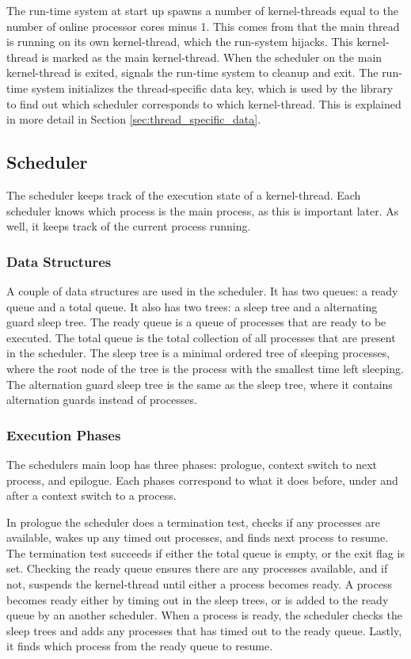 The run\hyp{}time system at start up spawns a number of kernel\hyp{}threads equal to the number of online processor cores minus 1. This comes from that the main thread is running on its own kernel\hyp{}thread, which the run\hyp{}system hijacks. This kernel\hyp{}thread is marked as the main kernel\hyp{}thread. When the scheduler on the main kernel\hyp{}thread is exited, signals the run\hyp{}time system to cleanup and exit. The run\hyp{}time system initializes the thread\hyp{}specific data key, which is used by the library to find out which scheduler corresponds to which kernel\hyp{}thread. This is explained in more detail in Section \ref{sec:thread_specific_data}.


\subsection{Scheduler}
\label{sec:scheduler}

The scheduler keeps track of the execution state of a kernel\hyp{}thread. Each scheduler knows which process is the main process, as this is important later. As well, it keeps track of the current process running. 

\subsubsection*{Data Structures}

A couple of data structures are used in the scheduler. It has two queues: a ready queue and a total queue. It also has two trees: a sleep tree and a alternating guard sleep tree. The ready queue is a queue of processes that are ready to be executed. The total queue is the total collection of all processes that are present in the scheduler. The sleep tree is a minimal ordered tree of sleeping processes, where the root node of the tree is the process with the smallest time left sleeping. The alternation guard sleep tree is the same as the sleep tree, where it contains alternation guards instead of processes.

\subsubsection*{Execution Phases}

The schedulers main loop has three phases: prologue, context switch to next process, and epilogue. Each phases correspond to what it does before, under and after a context switch to a process. 

In prologue the scheduler does a termination test, checks if any processes are available, wakes up any timed out processes, and finds next process to resume. The termination test succeeds if either the total queue is empty, or the exit flag is set. Checking the ready queue ensures there are any processes available, and if not, suspends the kernel\hyp{}thread until either a process becomes ready. A process becomes ready either by timing out in the sleep trees, or is added to the ready queue by an another scheduler. When a process is ready, the scheduler checks the sleep trees and adds any processes that has timed out to the ready queue. Lastly, it finds which process from the ready queue to resume.

